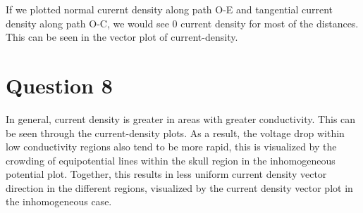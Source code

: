 \documentclass{article}
\begin{document}
If we plotted normal curernt density along path O-E and tangential current density along path O-C, we would see 0 current density for most of the distances. This can be seen in the vector plot of current-density.

\section{Question 8}
In general, current density is greater in areas with greater conductivity. This can be seen through the current-density plots. As a result, the voltage drop within low conductivity regions also tend to be more rapid, this is visualized by the crowding of equipotential lines within the skull region in the inhomogeneous potential plot. Together, this results in less uniform current density vector direction in the different regions, visualized by the current density vector plot in the inhomogeneous case.
\end{document}
